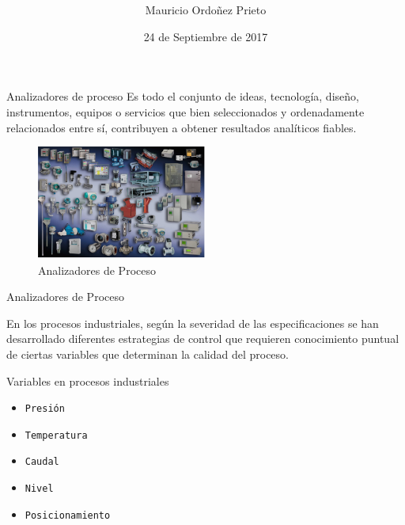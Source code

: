\documentclass[10pt]{beamer}
\title[Analizadores de proceso]{ }
\author{Mauricio Ordoñez Prieto}
\institute{Universidad Distrital Francisco Jose de Caladas}
\date{24 de Septiembre de 2017}
\begin{document}

{\1%
\begin{frame}{Analizadores de proceso}{ }
Es todo el conjunto de ideas, tecnología, diseño, instrumentos, equipos o servicios que bien seleccionados y ordenadamente relacionados entre sí, contribuyen a obtener resultados analíticos fiables.
\begin{figure}%
\includegraphics[width=0.5\textwidth]{figura_4.png} %
\caption{\label{fig:1}Analizadores de Proceso} %
\end{figure}
\end{frame}
\begin{frame}{Analizadores de Proceso}{ }  
\begin{center}
\end{center}
\vskip 0.5cm
\begin{center}
En los procesos industriales, según la severidad de las especificaciones se han desarrollado diferentes estrategias de control que requieren conocimiento puntual de ciertas variables que determinan la calidad del proceso.
\end{center}
\end{frame}
\begin{frame}{Variables en procesos industriales}{}
\begin{block}{}
  \begin{itemize}
    \item {\tt Presión}
    \item {\tt Temperatura}
    \item {\tt Caudal}
    \item {\tt Nivel}
    \item {\tt Posicionamiento}

\end{itemize}
\end{block}
\end{frame}}
\end{document}
